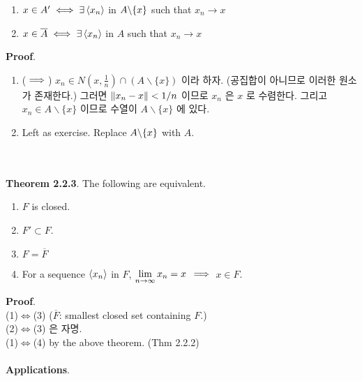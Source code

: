\begin{enumerate}
	\item $x\in A' \iff \exists \left\langle x_n \right\rangle$ in $A\backslash\{x\}$ such that $x_n\rightarrow x$
	\item $x\in \overline{A} \iff \exists \left\langle x_n \right\rangle$ in $A$ such that $x_n\rightarrow x$ 
\end{enumerate}
\textbf{Proof}.
\begin{enumerate}
	\item ($\implies$) $x_n\in N\left(x, \frac{1}{n} \right) \cap (A\backslash \{x\})$ 이라 하자. (공집합이 아니므로 이러한 원소가 존재한다.) 그러면 $\left\lVert x_n-x\right\rVert<1/n$ 이므로 $x_n$ 은 $x$ 로 수렴한다. 그리고 $x_n\in A\backslash\{x\}$ 이므로 수열이 $A\backslash\{x\}$ 에 있다.
	\item Left as exercise. Replace $A\backslash \{x\} $ with $A$.
\end{enumerate}~\\
\\
\textbf{Theorem 2.2.3}. The following are equivalent.
\begin{enumerate}
	\item $F$ is closed.
	\item $F'\subset F$.
	\item $F =\overline{F}$
	\item For a sequence $\left\langle x_n \right\rangle$ in $F$, $\displaystyle\lim_{n\rightarrow \infty} x_n = x$ $\implies$ $x\in F$.
\end{enumerate}
\textbf{Proof}. \\
(1)$\iff$(3) ($\overline{F}$: smallest closed set containing $F$.)\\
(2)$\iff$(3) 은 자명.\\
(1)$\iff$(4) by the above theorem. (Thm 2.2.2)\\
\\
\textbf{Applications}.
